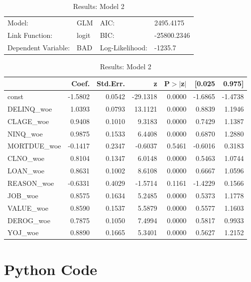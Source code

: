 \begin{appendices}
\begin{table}[H]
\renewcommand{\arraystretch}{1.25}
\begin{center}
\begin{tabular}{llll}
\hline
Model:              & GLM              & AIC:            & 2495.4175    \\
Link Function:      & logit            & BIC:            & -25800.2346  \\
Dependent Variable: & BAD              & Log-Likelihood: & -1235.7      \\
\hline
\end{tabular}
\end{center}
\begin{center}
\begin{tabular}{lrrrrrr}
\hline
             &  Coef.  & Std.Err. &    z     & P$> |$z$|$ &  [0.025 &  0.975]  \\
\hline
\hline
const        & -1.5802 &   0.0542 & -29.1318 &      0.0000 & -1.6865 & -1.4738  \\
DELINQ\_woe  &  1.0393 &   0.0793 &  13.1121 &      0.0000 &  0.8839 &  1.1946  \\
CLAGE\_woe   &  0.9408 &   0.1010 &   9.3183 &      0.0000 &  0.7429 &  1.1387  \\
NINQ\_woe    &  0.9875 &   0.1533 &   6.4408 &      0.0000 &  0.6870 &  1.2880  \\
MORTDUE\_woe & -0.1417 &   0.2347 &  -0.6037 &      0.5461 & -0.6016 &  0.3183  \\
CLNO\_woe    &  0.8104 &   0.1347 &   6.0148 &      0.0000 &  0.5463 &  1.0744  \\
LOAN\_woe    &  0.8631 &   0.1002 &   8.6108 &      0.0000 &  0.6667 &  1.0596  \\
REASON\_woe  & -0.6331 &   0.4029 &  -1.5714 &      0.1161 & -1.4229 &  0.1566  \\
JOB\_woe     &  0.8575 &   0.1634 &   5.2485 &      0.0000 &  0.5373 &  1.1778  \\
VALUE\_woe   &  0.8590 &   0.1537 &   5.5879 &      0.0000 &  0.5577 &  1.1603  \\
DEROG\_woe   &  0.7875 &   0.1050 &   7.4994 &      0.0000 &  0.5817 &  0.9933  \\
YOJ\_woe     &  0.8890 &   0.1665 &   5.3401 &      0.0000 &  0.5627 &  1.2152  \\
\hline
\end{tabular}
\end{center}
\caption{Results: Model 2 \label{table:results_2}}
\end{table}


\chapter{Python Code}









\end{appendices}
